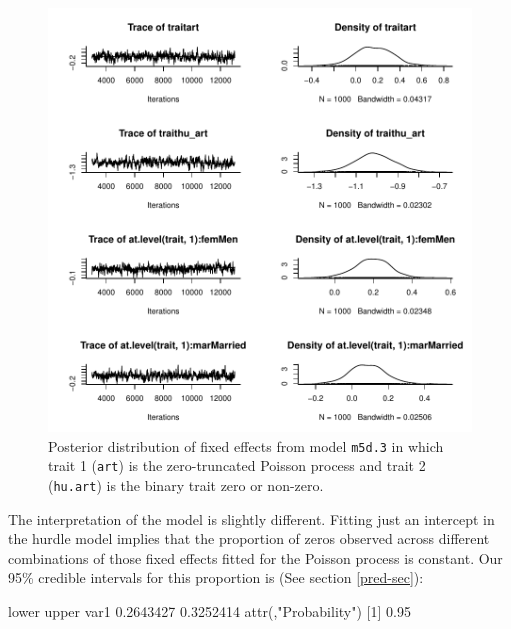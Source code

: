 \documentclass{article}
\begin{document}
\begin{figure}[!h]
\begin{center}
\includegraphics{Lecture5-046}
\end{center}
\caption{Posterior distribution of fixed effects from model \texttt{m5d.3} in which trait 1 (\texttt{art}) is the zero-truncated Poisson process and trait 2 (\texttt{hu.art}) is the binary trait zero or non-zero.}
\label{HU}
\end{figure}

The interpretation of the model is slightly different. Fitting just an intercept in the hurdle model implies that the proportion of zeros observed across different combinations of those fixed effects fitted for the Poisson process is constant. Our 95\% credible intervals for this proportion is (See section \ref{pred-sec}):

\begin{Schunk}
\begin{Soutput}
         lower     upper
var1 0.2643427 0.3252414
attr(,"Probability")
[1] 0.95
\end{Soutput}
\end{Schunk}
\end{document}
